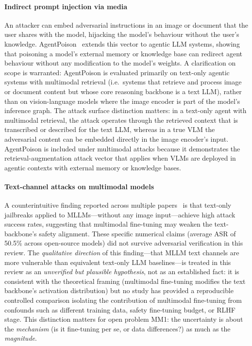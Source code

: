 \paragraph{Indirect prompt injection via media}
An attacker can embed adversarial instructions in an image or document that the user
shares with the model, hijacking the model's behaviour without the user's knowledge.
AgentPoison~\cite{chen2024agentpoison} extends this vector to agentic LLM systems,
showing that poisoning a model's external memory or knowledge base can redirect
agent behaviour without any modification to the model's weights.
A clarification on scope is warranted: AgentPoison is evaluated primarily on
text-only agentic systems with multimodal retrieval (i.e.\ systems that retrieve
and process image or document content but whose core reasoning backbone is a
text LLM), rather than on vision-language models where the image encoder is
part of the model's inference graph.
The attack surface distinction matters: in a text-only agent with multimodal
retrieval, the attack operates through the retrieved context that is transcribed
or described for the text LLM, whereas in a true VLM the adversarial content
can be embedded directly in the image encoder's input.
AgentPoison is included under multimodal attacks because it demonstrates the
retrieval-augmentation attack vector that applies when VLMs are deployed in
agentic contexts with external memory or knowledge bases.

\paragraph{Text-channel attacks on multimodal models}
A counterintuitive finding reported across multiple papers~\cite{zhao2024evaluating}
is that text-only jailbreaks applied to MLLMs---without any image input---achieve
high attack success rates, suggesting that multimodal fine-tuning may weaken the
text-backbone's safety alignment.
These specific numerical claims (average ASR of 50.5\% across open-source models)
did not survive adversarial verification in this review.
The \emph{qualitative direction} of this finding---that MLLM text channels are
more vulnerable than equivalent text-only LLM baselines---is treated in this
review as an \emph{unverified but plausible hypothesis}, not as an established
fact: it is consistent with the theoretical framing (multimodal fine-tuning
modifies the text backbone's activation distribution) but no study has provided
a reproducible controlled comparison isolating the contribution of multimodal
fine-tuning from confounds such as different training data, safety fine-tuning
budget, or RLHF stage.
This distinction matters for open problem MM1: the uncertainty is about the
\emph{mechanism} (is it fine-tuning per se, or data differences?) as much as the
\emph{magnitude}.

